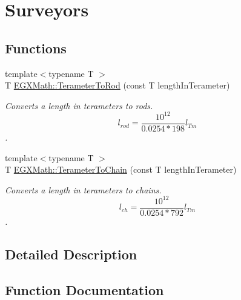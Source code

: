 \hypertarget{group___e_g_x_math-_conversions-_length_conversions-_terameter-_surveyors}{}\section{Surveyors}
\label{group___e_g_x_math-_conversions-_length_conversions-_terameter-_surveyors}
\subsection*{Functions}
\begin{DoxyCompactItemize}
\item 
{\footnotesize template$<$typename T $>$ }\\T \mbox{\hyperlink{group___e_g_x_math-_conversions-_length_conversions-_terameter-_surveyors_gaa3d08b1f4809bc73a7194ab85c849737}{E\+G\+X\+Math\+::\+Terameter\+To\+Rod}} (const T length\+In\+Terameter)
\begin{DoxyCompactList}\small\item\em Converts a length in terameters to rods. \[ l_{rod}= \frac{10^{12}}{0.0254 * 198} l_{Tm} \]. \end{DoxyCompactList}\item 
{\footnotesize template$<$typename T $>$ }\\T \mbox{\hyperlink{group___e_g_x_math-_conversions-_length_conversions-_terameter-_surveyors_gad6ead4722ba7575e34a276dadfdb928b}{E\+G\+X\+Math\+::\+Terameter\+To\+Chain}} (const T length\+In\+Terameter)
\begin{DoxyCompactList}\small\item\em Converts a length in terameters to chains. \[ l_{ch}= \frac{10^{12}}{0.0254 * 792} l_{Tm} \]. \end{DoxyCompactList}\end{DoxyCompactItemize}


\subsection{Detailed Description}


\subsection{Function Documentation}
\mbox{\label{group___e_g_x_math-_conversions-_length_conversions-_terameter-_surveyors_gad6ead4722ba7575e34a276dadfdb928b}} 
